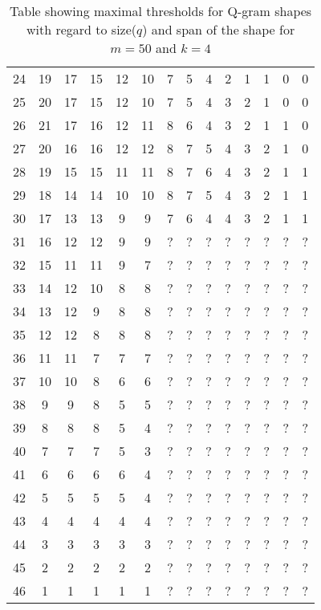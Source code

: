 \documentclass[paper=a4, fontsize=11pt]{scrartcl} %
\numberwithin{equation}{section} %
\numberwithin{figure}{section} %
\numberwithin{table}{section} %
\begin{document}
\begin{table}[H]
\begin{tabular} {|c|c|c|c|c|c|c|c|c|c|c|c|c|c|}
	24 & 19 & 17 & 15 & 12 & 10 & 7 & 5 & 4 & 2 & 1 & 1 & 0 & 0 \\
	25 & 20 & 17 & 15 & 12 & 10 & 7 & 5 & 4 & 3 & 2 & 1 & 0 & 0 \\
	26 & 21 & 17 & 16 & 12 & 11 & 8 & 6 & 4 & 3 & 2 & 1 & 1 & 0 \\
	27 & 20 & 16 & 16 & 12 & 12 & 8 & 7 & 5 & 4 & 3 & 2 & 1 & 0 \\
	28 & 19 & 15 & 15 & 11 & 11 & 8 & 7 & 6 & 4 & 3 & 2 & 1 & 1 \\
	29 & 18 & 14 & 14 & 10 & 10 & 8 & 7 & 5 & 4 & 3 & 2 & 1 & 1 \\
	30 & 17 & 13 & 13 & 9 & 9 & 7 & 6 & 4 & 4 & 3 & 2 & 1 & 1 \\
	31 & 16 & 12 & 12 & 9 & 9 & ? & ? & ? & ? & ? & ? & ? & ? \\
	32 & 15 & 11 & 11 & 9 & 7 & ? & ? & ? & ? & ? & ? & ? & ? \\
	33 & 14 & 12 & 10 & 8 & 8 & ? & ? & ? & ? & ? & ? & ? & ? \\
	34 & 13 & 12 & 9 & 8 & 8 & ? & ? & ? & ? & ? & ? & ? & ? \\
	35 & 12 & 12 & 8 & 8 & 8 & ? & ? & ? & ? & ? & ? & ? & ? \\
	36 & 11 & 11 & 7 & 7 & 7 & ? & ? & ? & ? & ? & ? & ? & ? \\
	37 & 10 & 10 & 8 & 6 & 6 & ? & ? & ? & ? & ? & ? & ? & ? \\
	38 & 9 & 9 & 8 & 5 & 5 & ? & ? & ? & ? & ? & ? & ? & ? \\
	39 & 8 & 8 & 8 & 5 & 4 & ? & ? & ? & ? & ? & ? & ? & ? \\
	40 & 7 & 7 & 7 & 5 & 3 & ? & ? & ? & ? & ? & ? & ? & ? \\
	41 & 6 & 6 & 6 & 6 & 4 & ? & ? & ? & ? & ? & ? & ? & ? \\
	42 & 5 & 5 & 5 & 5 & 4 & ? & ? & ? & ? & ? & ? & ? & ? \\
	43 & 4 & 4 & 4 & 4 & 4 & ? & ? & ? & ? & ? & ? & ? & ? \\
	44 & 3 & 3 & 3 & 3 & 3 & ? & ? & ? & ? & ? & ? & ? & ? \\
	45 & 2 & 2 & 2 & 2 & 2 & ? & ? & ? & ? & ? & ? & ? & ? \\
	46 & 1 & 1 & 1 & 1 & 1 & ? & ? & ? & ? & ? & ? & ? & ? \\ \hline
\end{tabular}
\caption{Table showing maximal thresholds for Q-gram shapes with regard to
size($q$) and span of the shape for $m=50$ and $k=4$}
\label{tab:res1}
\end{table}
\end{document}
